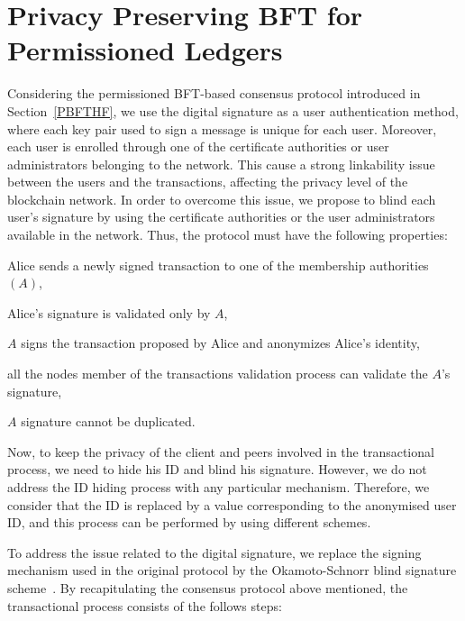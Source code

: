 \documentclass[conference]{llncs}
\begin{document}
\section{Privacy Preserving BFT for Permissioned Ledgers}\label{PPPBFT}

Considering the permissioned BFT-based consensus protocol introduced in Section~\ref{PBFTHF}, we use the digital signature as a user authentication method, where each key pair used to sign a message is unique for each user. Moreover, each user is enrolled through one of the certificate authorities or user administrators belonging to the network. This cause a strong linkability issue between the users and the transactions, affecting the privacy level of the blockchain network. In order to overcome this issue, we propose to blind each user's signature by using the certificate authorities or the user administrators available in the network. Thus, the protocol must have the following properties:  

\begin{compactitem}
    \item Alice sends a newly signed transaction to one of the membership authorities $(A)$,
    \item Alice’s signature is validated only by $A$,
    \item $A$ signs the transaction proposed by Alice and anonymizes Alice’s identity,
    \item all the nodes member of the transactions validation process can validate the $A$'s signature,
    \item $A$ signature cannot be duplicated.
\end{compactitem}

Now, to keep the privacy of the client and peers involved in the transactional process, we need to hide his ID and blind his signature. However, we do not address the ID hiding process with any particular mechanism. Therefore, we consider that the ID is replaced by a value corresponding to the anonymised user ID, and this process can be performed by using different schemes.

To address the issue related to the digital signature, we replace the signing mechanism used in the original protocol by the Okamoto-Schnorr blind signature scheme~\cite{okamoto1992provably}. By recapitulating the consensus protocol above mentioned, the transactional process consists of the follows steps:
\end{document}
